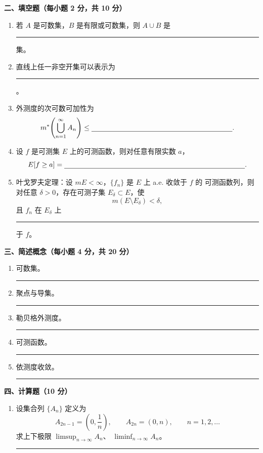 \documentclass[UTF8,11pt,fontset=fandol]{ctexart}
\newcommand{\examsection}[1]{%
  \par\vspace{0.35em}
  \begin{center}
    \large\bfseries #1
  \end{center}
  \vspace{0.15em}
}
\newcommand{\blank}[1]{\rule[-0.25em]{#1}{0.4pt}}
\newcommand{\answerarea}[1]{%
  \par\vspace{0.25em}
  \rule{\linewidth}{0pt}\par
  \vspace{#1}
}
\begin{document}
\newpage

\examsection{二、填空题（每小题 2 分，共 10 分）}

\begin{enumerate}
  \item 若 $A$ 是可数集，$B$ 是有限或可数集，则 $A\cup B$ 是\blank{5cm}集。

  \item 直线上任一非空开集可以表示为\blank{8cm}。

  \item 外测度的次可数可加性为
    \[
      m^{*}\!\left(\bigcup_{n=1}^{\infty}A_n\right)
      \le \blank{7cm}.
    \]

  \item 设 $f$ 是可测集 $E$ 上的可测函数，则对任意有限实数 $a$，
    \[
      E[f\geq a]=\blank{9cm}.
    \]

  \item 叶戈罗夫定理：设 $mE<\infty$，$\{f_n\}$ 是 $E$ 上 a.e. 收敛于 $f$ 的
    可测函数列，则对任意 $\delta>0$，存在可测子集 $E_{\delta}\subset E$，使
    \[
      m(E\setminus E_{\delta})<\delta,
    \]
    且 $f_n$ 在 $E_{\delta}$ 上\blank{5cm}于 $f$。
\end{enumerate}

\vspace{0.7em}
\examsection{三、简述概念（每小题 4 分，共 20 分）}

\begin{enumerate}
  \item 可数集。
    \answerarea{1.05cm}

  \item 聚点与导集。
    \answerarea{1.05cm}

  \item 勒贝格外测度。
    \answerarea{1.05cm}

  \item 可测函数。
    \answerarea{1.05cm}

  \item 依测度收敛。
    \answerarea{1.05cm}
\end{enumerate}

\newpage

\examsection{四、计算题（10 分）}

\begin{enumerate}
  \item 设集合列 $\{A_n\}$ 定义为
    \[
      A_{2n-1}=\left(0,\frac{1}{n}\right),\qquad
      A_{2n}=(0,n),\qquad n=1,2,\ldots
    \]
    求上下极限 $\displaystyle\limsup_{n\to\infty}A_n$、
    $\displaystyle\liminf_{n\to\infty}A_n$。
    \answerarea{4.5cm}
\end{enumerate}
\end{document}
